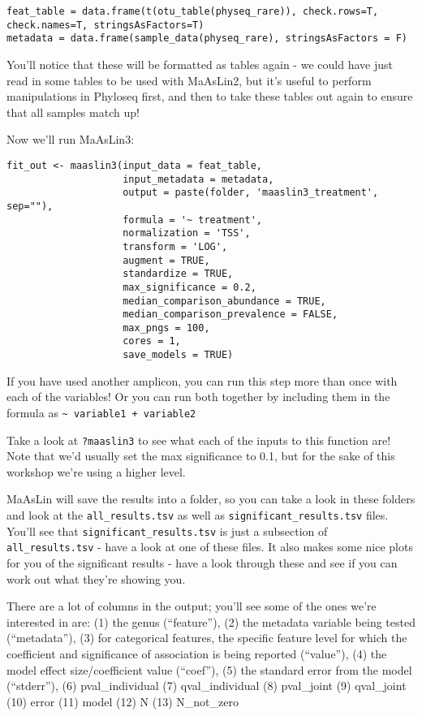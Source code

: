 \documentclass[
]{book}
\begin{document}
\begin{verbatim}
feat_table = data.frame(t(otu_table(physeq_rare)), check.rows=T, check.names=T, stringsAsFactors=T)
metadata = data.frame(sample_data(physeq_rare), stringsAsFactors = F)
\end{verbatim}

You'll notice that these will be formatted as tables again - we could have just read in some tables to be used with MaAsLin2, but it's useful to perform manipulations in Phyloseq first, and then to take these tables out again to ensure that all samples match up!

Now we'll run MaAsLin3:

\begin{verbatim}
fit_out <- maaslin3(input_data = feat_table,
                    input_metadata = metadata,
                    output = paste(folder, 'maaslin3_treatment', sep=""),
                    formula = '~ treatment',
                    normalization = 'TSS',
                    transform = 'LOG',
                    augment = TRUE,
                    standardize = TRUE,
                    max_significance = 0.2,
                    median_comparison_abundance = TRUE,
                    median_comparison_prevalence = FALSE,
                    max_pngs = 100,
                    cores = 1,
                    save_models = TRUE)
\end{verbatim}

If you have used another amplicon, you can run this step more than once with each of the variables! Or you can run both together by including them in the formula as \texttt{\textasciitilde{}\ variable1\ +\ variable2}

Take a look at \texttt{?maaslin3} to see what each of the inputs to this function are! Note that we'd usually set the max significance to 0.1, but for the sake of this workshop we're using a higher level.

MaAsLin will save the results into a folder, so you can take a look in these folders and look at the \texttt{all\_results.tsv} as well as \texttt{significant\_results.tsv} files. You'll see that \texttt{significant\_results.tsv} is just a subsection of \texttt{all\_results.tsv} - have a look at one of these files. It also makes some nice plots for you of the significant results - have a look through these and see if you can work out what they're showing you.

There are a lot of columns in the output; you'll see some of the ones we're interested in are: (1) the genus (``feature''), (2) the metadata variable being tested (``metadata''), (3) for categorical features, the specific feature level for which the coefficient and significance of association is being reported (``value''), (4) the model effect size/coefficient value (``coef''), (5) the standard error from the model (``stderr''), (6)
pval\_individual (7) qval\_individual (8) pval\_joint (9) qval\_joint (10) error (11) model (12) N (13) N\_not\_zero
\end{document}
